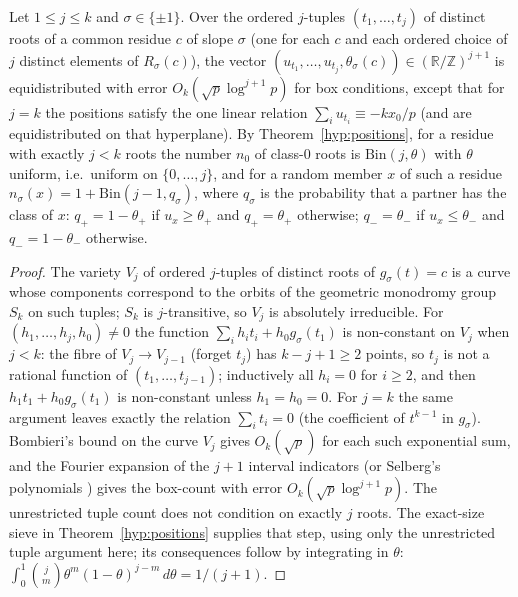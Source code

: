 \begin{lemma}\label{lem:positions}
Let $1\le j\le k$ and $\sigma\in\{\pm1\}$.  Over the ordered $j$-tuples $(t_1,\dots,t_j)$ of distinct roots of a common residue $c$ of slope $\sigma$ (one for each $c$
and each ordered choice of $j$ distinct elements of $R_\sigma(c)$), the vector $(u_{t_1},\dots,u_{t_j},\theta_\sigma(c))\in(\mathbb R/\mathbb Z)^{j+1}$ is equidistributed
with error $O_k(\sqrt p\log^{j+1}p)$ for box conditions, except that for $j=k$ the positions satisfy the one linear relation $\sum_iu_{t_i}\equiv-kx_0/p$
(and are equidistributed on that hyperplane).  By Theorem~\ref{hyp:positions}, for a residue with exactly $j<k$ roots the number $n_0$ of class-$0$ roots is $\mathrm{Bin}(j,\theta)$
with $\theta$ uniform, i.e.\ uniform on $\{0,\dots,j\}$, and for a random member $x$ of such a residue $n_\sigma(x)=1+\mathrm{Bin}(j-1,q_\sigma)$, where
$q_\sigma$ is the probability that a partner has the class of $x$: $q_+=1-\theta_+$ if $u_x\ge\theta_+$ and $q_+=\theta_+$ otherwise;
$q_-=\theta_-$ if $u_x\le\theta_-$ and $q_-=1-\theta_-$ otherwise.
\end{lemma}
\begin{proof}
The variety $V_j$ of ordered $j$-tuples of distinct roots of $g_\sigma(t)=c$ is a curve whose components correspond to the orbits of the geometric monodromy
group $S_k$ on such tuples; $S_k$ is $j$-transitive, so $V_j$ is absolutely irreducible.  For $(h_1,\dots,h_j,h_0)\ne0$ the function
$\sum_ih_it_i+h_0g_\sigma(t_1)$ is non-constant on $V_j$ when $j<k$: the fibre of $V_j\to V_{j-1}$ (forget $t_j$) has $k-j+1\ge2$ points, so $t_j$ is not a
rational function of $(t_1,\dots,t_{j-1})$; inductively all $h_i=0$ for $i\ge2$, and then $h_1t_1+h_0g_\sigma(t_1)$ is non-constant unless $h_1=h_0=0$.  For
$j=k$ the same argument leaves exactly the relation $\sum_it_i=0$ (the coefficient of $t^{k-1}$ in $g_\sigma$).  Bombieri's bound on the curve $V_j$
\cite{IK} gives $O_k(\sqrt p)$ for each such exponential sum, and the Fourier expansion of the $j+1$ interval indicators (or Selberg's polynomials
\cite{Montgomery,Vaaler}) gives the box-count with error $O_k(\sqrt p\log^{j+1}p)$.  The unrestricted tuple count does not condition on exactly $j$ roots.  The exact-size sieve in Theorem~\ref{hyp:positions} supplies that step, using only the unrestricted tuple argument here; its consequences follow by integrating in $\theta$:
$\int_0^1\binom j m\theta^m(1-\theta)^{j-m}\,d\theta=1/(j+1)$.
\end{proof}

